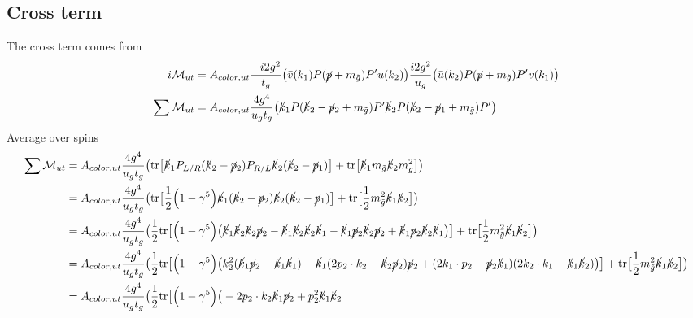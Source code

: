 \documentclass[11pt]{article}
\begin{document}
\subsection*{Cross term}
\begin{flushleft}
The cross term comes from
\begin{align*}
i \mathcal{M}_{ut} &= A_{color, ut}\frac{-i 2 g^2}{t_g}\big( \bar{v} (k_1)  P (\cancel{p} + m_{\tilde{g}}) P'u(k_2) \big)  \frac{i 2 g^2}{u_g} \big( \bar{u} (k_2)  P (\cancel{p} + m_{\tilde{g}}) P' v(k_1) \big)\\
\sum \mathcal{M}_{ut} &= A_{color, ut} \frac{4 g^4}{u_gt_g}\big( \cancel{k}_1   P (\cancel{k}_2 - \cancel{p}_2 + m_{\tilde{g}}) P'\cancel{k}_2  P (\cancel{k}_2 -\cancel{p}_1 + m_{\tilde{g}}) P' \big)\\
\end{align*}
Average over spins
\begin{align*}
\sum  \mathcal{M}_{ut} &=  A_{color, ut} \frac{4 g^4}{u_gt_g}\big( \text{tr} \big[ \cancel{k}_1 P_{L/R} (\cancel{k}_2 - \cancel{p}_2)P_{R/L} \cancel{k}_2(\cancel{k}_2-\cancel{p}_1) \big] + \text{tr} \big[ \cancel{k}_1 m_{\tilde{g}} \cancel{k}_2 m_{g}^2 \big]\big)\\
&= A_{color, ut} \frac{4 g^4}{u_gt_g} \big(
 \text{tr} \big[ \frac{1}{2}\Big(1 - \gamma^5 \Big) \cancel{k}_1 (\cancel{k}_2 - \cancel{p}_2) \cancel{k}_2(\cancel{k}_2-\cancel{p}_1) \big] + \text{tr} \big[\frac{1}{2} m_{\tilde{g}}^2 \cancel{k}_1  \cancel{k}_2\big]
  \big)\\
&= A_{color, ut} \frac{4 g^4}{u_gt_g} \big(
 \frac{1}{2} \text{tr} \big[\Big(1 - \gamma^5 \Big) \big( \cancel{k}_1 \cancel{k}_2 \cancel{k}_2\cancel{p}_2 -  \cancel{k}_1 \cancel{k}_2 \cancel{k}_2\cancel{k}_1 -  \cancel{k}_1 \cancel{p}_2 \cancel{k}_2\cancel{p}_2 +  \cancel{k}_1 \cancel{p}_2 \cancel{k}_2\cancel{k}_1 \big) \big] + \text{tr} \big[\frac{1}{2} m_{\tilde{g}}^2 \cancel{k}_1  \cancel{k}_2\big]
  \big)\\
&= A_{color, ut} \frac{4 g^4}{u_gt_g} \big(
 \frac{1}{2} \text{tr} \big[\Big(1 - \gamma^5 \Big) \big(k_2^2 (\cancel{k}_1 \cancel{p}_2 -  \cancel{k}_1 \cancel{k}_1)
  -  \cancel{k}_1 (2 p_2 \cdot k_2 -  \cancel{k}_2\cancel{p}_2)\cancel{p}_2 +  (2k_1 \cdot p_2 - \cancel{p}_2 \cancel{k}_1 )(2k_2 \cdot k_1 - \cancel{k}_1\cancel{k}_2) \big) \big] + \text{tr} \big[\frac{1}{2} m_{\tilde{g}}^2 \cancel{k}_1  \cancel{k}_2\big]
  \big)\\
 &= A_{color, ut} \frac{4 g^4}{u_gt_g} \big(
 \frac{1}{2} \text{tr} \big[\Big(1 - \gamma^5 \Big) \big(
  -   2 p_2 \cdot k_2\cancel{k}_1\cancel{p}_2 + p_2^2  \cancel{k}_1\cancel{k}_2 \\

\end{align*}
\end{flushleft}
\end{document}
